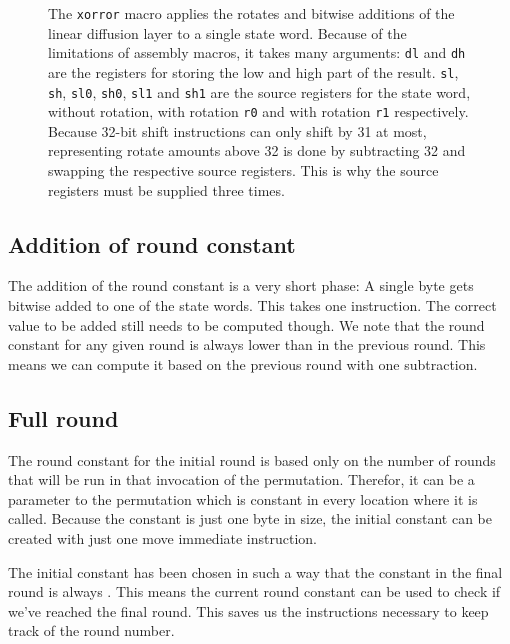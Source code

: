 \begin{figure}[p]


\caption{The \texttt{xorror} macro applies the rotates and bitwise additions of
the linear diffusion layer to a single state word. Because of the limitations of
assembly macros, it takes many arguments:
\texttt{dl} and \texttt{dh} are the registers for storing the low and high part
of the result. \texttt{sl}, \texttt{sh}, \texttt{sl0}, \texttt{sh0},
\texttt{sl1} and \texttt{sh1} are the source registers for the state word,
without rotation, with rotation \texttt{r0} and with rotation \texttt{r1}
respectively. Because 32-bit shift instructions can only shift by 31 at most,
representing rotate amounts above 32 is done by subtracting 32 and swapping the
respective source registers. This is why the source registers must be supplied
three times.}

\label{xorror}
\end{figure}

\subsection{Addition of round constant}

The addition of the round constant is a very short phase: A single byte gets
bitwise added to one of the state words. This takes one instruction. The correct
value to be added still needs to be computed though. We note that the round
constant for any given round is always  lower than in the previous round.
This means we can compute it based on the previous round with one subtraction.

\subsection{Full round}

The round constant for the initial round is based only on the number of rounds
that will be run in that invocation of the permutation. Therefor, it can be a
parameter to the permutation which is constant in every location where it is
called. Because the constant is just one byte in size, the initial constant can
be created with just one move immediate instruction.

The initial constant has been chosen in such a way that the constant in the
final round is always . This means the current round constant can be
used to check if we've reached the final round. This saves us the instructions
necessary to keep track of the round number.

